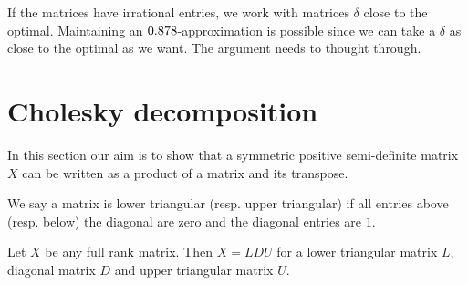 \documentclass[12pt,
    driverfallback=dvipdfm,
 	openany,
    a4paper,
    toc=bibliography,
    twoside,
    numbers=noenddot]{article}              %
\begin{document}
\begin{mdframed}[backgroundcolor=light-gray, linecolor=light-gray]
If the matrices have irrational entries, we work with matrices $\delta$ close to the optimal. Maintaining an $0.878$-approximation is possible since we can take a $\delta$ as close to the optimal as we want. The argument needs to thought through.
\end{mdframed}

\section{Cholesky decomposition}
\label{sec:cholesky}
In this section our aim is to show that a symmetric positive semi-definite matrix $X$ can be written as a product of a matrix and its transpose. 

\begin{mdframed}[backgroundcolor=light-gray, linecolor=light-gray]
We say a matrix is lower triangular (resp. upper triangular) if all entries above (resp. below) the diagonal are zero and the diagonal entries are $1$.
\begin{claim}
Let $X$ be any full rank matrix. Then $X = L D U$ for a lower triangular matrix $L$, diagonal matrix $D$ and upper triangular matrix $U$. 


\end{claim}
\end{mdframed}
\end{document}
